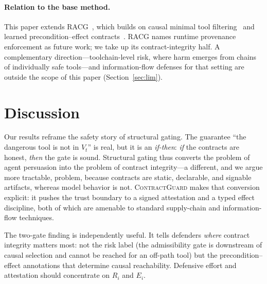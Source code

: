 \documentclass[conference,onecolumn]{IEEEtran}
\theoremstyle{definition}
\newcommand{\racg}{\textsc{RACG}}
\newcommand{\cg}{\textsc{ContractGuard}}
\newcommand{\Vt}{V_t}
\begin{document}
\paragraph{Relation to the base method.}
This paper extends \racg~\cite{iyer2026racg}, which builds on causal minimal tool
filtering~\cite{anon2026cmtf} and learned precondition--effect
contracts~\cite{iyer2026contract2tool}. \racg{} names runtime provenance
enforcement as future work; we take up its contract-integrity half. A
complementary direction---toolchain-level risk, where harm emerges from chains of
individually safe tools---and information-flow defenses for that setting are
outside the scope of this paper (Section~\ref{sec:lim}).

\section{Discussion}
\label{sec:disc}
Our results reframe the safety story of structural gating. The guarantee
``the dangerous tool is not in $\Vt$'' is real, but it is an
\emph{if-then}: \emph{if} the contracts are honest, \emph{then} the gate is
sound. Structural gating thus converts the problem of agent persuasion into the
problem of contract integrity---a different, and we argue more tractable,
problem, because contracts are static, declarable, and signable artifacts,
whereas model behavior is not. \cg{} makes that conversion explicit: it pushes
the trust boundary to a signed attestation and a typed effect discipline, both
of which are amenable to standard supply-chain and information-flow techniques.

The two-gate finding is independently useful. It tells defenders \emph{where}
contract integrity matters most: not the risk label (the admissibility gate is
downstream of causal selection and cannot be reached for an off-path tool) but
the precondition--effect annotations that determine causal reachability.
Defensive effort and attestation should concentrate on $R_i$ and $E_i$.

\end{document}
